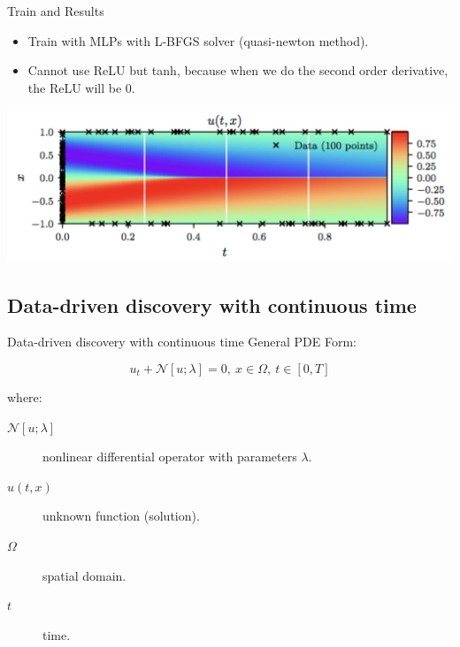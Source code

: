 \documentclass[aspectratio=1610,xcolor={dvipsnames},hyperref={colorlinks,unicode,linkcolor=violet,anchorcolor=BlueViolet,citecolor=YellowOrange,filecolor=black,urlcolor=Aquamarine}]{beamer}
\begin{document}
\begin{frame}[label={sec:org4a257a1}]{Train and Results}
\begin{itemize}
\item Train with MLPs with L-BFGS solver (quasi-newton method).
\item Cannot use ReLU but tanh, because when we do the second order derivative, the ReLU will be 0.
\end{itemize}

\begin{center}
\includegraphics[width=.9\linewidth]{./p7.png}
\end{center}
\end{frame}

\subsection{Data-driven discovery with continuous time}
\label{sec:org81b5918}

\begin{frame}[label={sec:org9ac7717}]{Data-driven discovery with continuous time}
General PDE Form:

\[u_t + \mathcal{N}[u;\lambda] = 0,\ x \in \Omega, \ t\in[0,T]\]

where:
\begin{description}
\item[{\(\mathcal{N}[u;\lambda]\)}] nonlinear differential operator with parameters \(\lambda\).
\item[{\(u(t, x)\)}] unknown function (solution).
\item[{\(\Omega\)}] spatial domain.
\item[{\(t\)}] time.
\end{description}
\end{frame}
\end{document}
